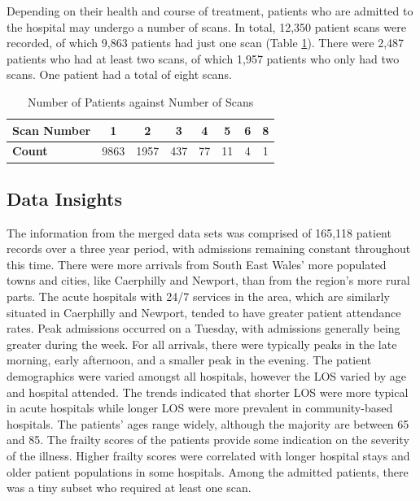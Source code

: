 \documentclass[../thesis.tex]{subfiles}
\begin{document}
Depending on their health and course of treatment, patients who are admitted to the hospital may undergo a number of scans. In total, 12,350 patient scans were recorded, of which 9,863 patients had just one scan (Table \ref{Tab:Scan}). There were 2,487 patients who had at least two scans, of which 1,957 patients who only had two scans. One patient had a total of eight scans. 

\begin{table}[h!]
    \centering
    \begin{tabular}{lccccccc}\toprule
    \textbf{Scan Number} & \textbf{1} & \textbf{2} & \textbf{3} & \textbf{4} & \textbf{5} & \textbf{6} & \textbf{8}   \\ \midrule
\textbf{Count} & 9863 & 1957 & 437 & 77 & 11 & 4& 1\\ \bottomrule
    \end{tabular}
    \caption{Number of Patients against Number of Scans}
    \label{Tab:Scan}
\end{table}

\subsection{Data Insights}
The information from the merged data sets was comprised of 165,118 patient records over a three year period, with admissions remaining constant throughout this time. There were more arrivals from South East Wales' more populated towns and cities, like Caerphilly and Newport, than from the region's more rural parts. The acute hospitals with 24/7 services in the area, which are similarly situated in Caerphilly and Newport, tended to have greater patient attendance rates. Peak admissions occurred on a Tuesday, with admissions generally being greater during the week. For all arrivals, there were typically peaks in the late morning, early afternoon, and a smaller peak in the evening. The patient demographics were varied amongst all hospitals, however the LOS varied by age and hospital attended. The trends indicated that shorter LOS were more typical in acute hospitals while longer LOS were more prevalent in community-based hospitals. The patients' ages range widely, although the majority are between 65 and 85. The frailty scores of the patients provide some indication on the severity of the illness. Higher frailty scores were correlated with longer hospital stays and older patient populations in some hospitals. Among the admitted patients, there was a tiny subset who required at least one scan.
\end{document}

